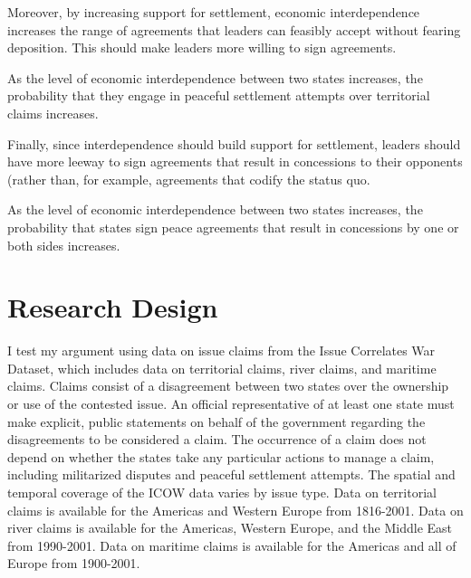 \noindent Moreover, by increasing support for settlement, economic interdependence increases the range of agreements that leaders can feasibly accept without fearing deposition. This should make leaders more willing to sign agreements. 

\begin{hypothesis} As the level of economic interdependence between two states increases, the probability that they engage in peaceful settlement attempts over territorial claims increases. \label{hyp: attempts} \end{hypothesis}

\noindent Finally, since interdependence should build support for settlement, leaders should have more leeway to sign agreements that result in concessions to their opponents (rather than, for example, agreements that codify the status quo.

\begin{hypothesis} As the level of economic interdependence between two states increases, the probability that states sign peace agreements that result in concessions by one or both sides increases. \label{hyp: concessions} \end{hypothesis}


\section{Research Design}

I test my argument using data on issue claims from the Issue Correlates War Dataset, which includes data on territorial claims, river claims, and maritime claims. Claims consist of a disagreement between two states over the ownership or use of the contested issue. An official representative of at least one state must make explicit, public statements on behalf of the government regarding the disagreements to be considered a claim. The occurrence of a claim does not depend on whether the states take any particular actions to manage a claim, including militarized disputes and peaceful settlement attempts. The spatial and temporal coverage of the ICOW data varies by issue type. Data on territorial claims is available for the Americas and Western Europe from 1816-2001. Data on river claims is available for the Americas, Western Europe, and the Middle East from 1990-2001. Data on maritime claims is available for the Americas and all of Europe from 1900-2001.

